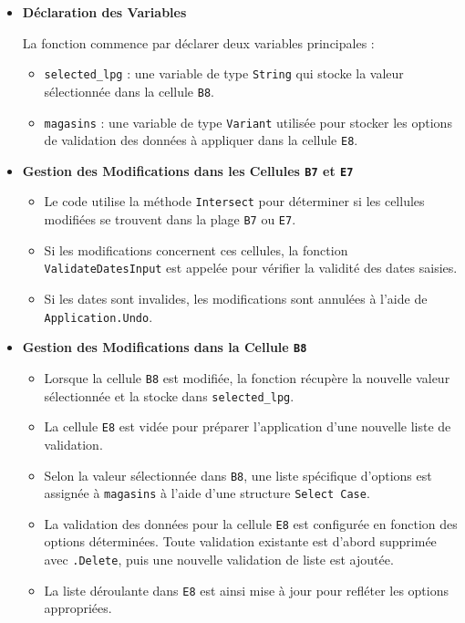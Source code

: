\documentclass[a4paper, oneside, 12pt, final]{extreport}
\begin{document}
\begin{itemize}
    \item \textbf{Déclaration des Variables}

    La fonction commence par déclarer deux variables principales :

    \begin{itemize}
        \item \texttt{selected\_lpg} : une variable de type \texttt{String} qui stocke la valeur sélectionnée dans la cellule \texttt{B8}.
        \item \texttt{magasins} : une variable de type \texttt{Variant} utilisée pour stocker les options de validation des données à appliquer dans la cellule \texttt{E8}.
    \end{itemize}

    \item \textbf{Gestion des Modifications dans les Cellules \texttt{B7} et \texttt{E7}}

    \begin{itemize}
        \item Le code utilise la méthode \texttt{Intersect} pour déterminer si les cellules modifiées se trouvent dans la plage \texttt{B7} ou \texttt{E7}.
        \item Si les modifications concernent ces cellules, la fonction \texttt{ValidateDatesInput} est appelée pour vérifier la validité des dates saisies.
        \item Si les dates sont invalides, les modifications sont annulées à l'aide de \texttt{Application.Undo}.
    \end{itemize}

    \item \textbf{Gestion des Modifications dans la Cellule \texttt{B8}}

    \begin{itemize}
        \item Lorsque la cellule \texttt{B8} est modifiée, la fonction récupère la nouvelle valeur sélectionnée et la stocke dans \texttt{selected\_lpg}.
        \item La cellule \texttt{E8} est vidée pour préparer l'application d'une nouvelle liste de validation.
        \item Selon la valeur sélectionnée dans \texttt{B8}, une liste spécifique d'options est assignée à \texttt{magasins} à l'aide d'une structure \texttt{Select Case}.
        \item La validation des données pour la cellule \texttt{E8} est configurée en fonction des options déterminées. Toute validation existante est d'abord supprimée avec \texttt{.Delete}, puis une nouvelle validation de liste est ajoutée.
        \item La liste déroulante dans \texttt{E8} est ainsi mise à jour pour refléter les options appropriées.
    \end{itemize}
\end{itemize}
\end{document}
